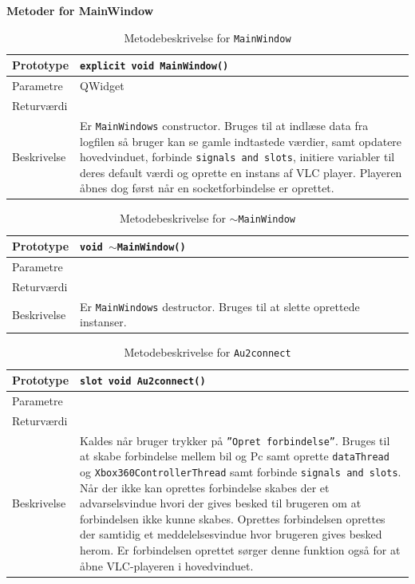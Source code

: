 \textbf{Metoder for MainWindow}

\begin{table}[H]
\begin{tabularx}{\textwidth}{| l | Z |} \hline
Prototype & \texttt{explicit void MainWindow()} \\\hline
Parametre &  QWidget \\\hline
Returværdi &  \\\hline
Beskrivelse & Er \texttt{MainWindows} constructor. Bruges til at indlæse data fra logfilen så bruger kan se gamle indtastede værdier, samt opdatere hovedvinduet, forbinde \texttt{signals and slots}, initiere variabler til deres default værdi og oprette en instans af VLC player. Playeren åbnes dog først når en socketforbindelse er oprettet.   \\\hline
\end{tabularx}
\caption{Metodebeskrivelse for \texttt{MainWindow}}
\label{table:met_MainWindow}
\end{table}


\clearpage

\begin{table}[H]
\begin{tabularx}{\textwidth}{| l | Z |} \hline
Prototype & \texttt{void $\sim$MainWindow()} \\\hline
Parametre &  \\\hline
Returværdi &  \\\hline
Beskrivelse & Er \texttt{MainWindows} destructor. Bruges til at slette oprettede instanser. \\\hline
\end{tabularx}
\caption{Metodebeskrivelse for \texttt{$\sim$MainWindow}}
\label{table:met_sMainWindow}
\end{table}


\begin{table}[H]
\begin{tabularx}{\textwidth}{| l | Z |} \hline
Prototype & \texttt{slot void Au2connect()} \\\hline
Parametre &   \\\hline
Returværdi &  \\\hline
Beskrivelse & Kaldes når bruger trykker på \texttt{''Opret forbindelse''}. Bruges til at skabe forbindelse mellem bil og Pc samt oprette \texttt{dataThread} og \texttt{Xbox360ControllerThread} samt forbinde \texttt{signals and slots}. Når der ikke kan oprettes forbindelse skabes der et advarselsvindue hvori der gives besked til brugeren om at forbindelsen ikke kunne skabes. Oprettes forbindelsen oprettes der samtidig et meddelelsesvindue hvor brugeren gives besked herom. Er forbindelsen oprettet sørger denne funktion også for at åbne VLC-playeren i hovedvinduet. \\\hline
\end{tabularx}
\caption{Metodebeskrivelse for \texttt{Au2connect}}
\label{table:met_Au2connect}
\end{table}

